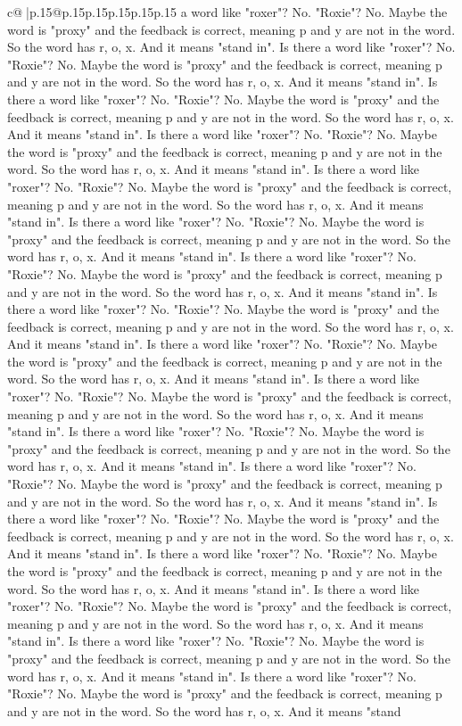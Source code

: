 \documentclass{article}
\begin{document}
{\begin{supertabular}{c@{$\;$}|p{.15\linewidth}@{}p{.15\linewidth}p{.15\linewidth}p{.15\linewidth}p{.15\linewidth}p{.15\linewidth}}
{{{a word like "roxer"? No. "Roxie"? No. Maybe the word is "proxy" and the feedback is correct, meaning p and y are not in the word. So the word has r, o, x. And it means "stand in". Is there a word like "roxer"? No. "Roxie"? No. Maybe the word is "proxy" and the feedback is correct, meaning p and y are not in the word. So the word has r, o, x. And it means "stand in". Is there a word like "roxer"? No. "Roxie"? No. Maybe the word is "proxy" and the feedback is correct, meaning p and y are not in the word. So the word has r, o, x. And it means "stand in". Is there a word like "roxer"? No. "Roxie"? No. Maybe the word is "proxy" and the feedback is correct, meaning p and y are not in the word. So the word has r, o, x. And it means "stand in". Is there a word like "roxer"? No. "Roxie"? No. Maybe the word is "proxy" and the feedback is correct, meaning p and y are not in the word. So the word has r, o, x. And it means "stand in". Is there a word like "roxer"? No. "Roxie"? No. Maybe the word is "proxy" and the feedback is correct, meaning p and y are not in the word. So the word has r, o, x. And it means "stand in". Is there a word like "roxer"? No. "Roxie"? No. Maybe the word is "proxy" and the feedback is correct, meaning p and y are not in the word. So the word has r, o, x. And it means "stand in". Is there a word like "roxer"? No. "Roxie"? No. Maybe the word is "proxy" and the feedback is correct, meaning p and y are not in the word. So the word has r, o, x. And it means "stand in". Is there a word like "roxer"? No. "Roxie"? No. Maybe the word is "proxy" and the feedback is correct, meaning p and y are not in the word. So the word has r, o, x. And it means "stand in". Is there a word like "roxer"? No. "Roxie"? No. Maybe the word is "proxy" and the feedback is correct, meaning p and y are not in the word. So the word has r, o, x. And it means "stand in". Is there a word like "roxer"? No. "Roxie"? No. Maybe the word is "proxy" and the feedback is correct, meaning p and y are not in the word. So the word has r, o, x. And it means "stand in". Is there a word like "roxer"? No. "Roxie"? No. Maybe the word is "proxy" and the feedback is correct, meaning p and y are not in the word. So the word has r, o, x. And it means "stand in". Is there a word like "roxer"? No. "Roxie"? No. Maybe the word is "proxy" and the feedback is correct, meaning p and y are not in the word. So the word has r, o, x. And it means "stand in". Is there a word like "roxer"? No. "Roxie"? No. Maybe the word is "proxy" and the feedback is correct, meaning p and y are not in the word. So the word has r, o, x. And it means "stand in". Is there a word like "roxer"? No. "Roxie"? No. Maybe the word is "proxy" and the feedback is correct, meaning p and y are not in the word. So the word has r, o, x. And it means "stand in". Is there a word like "roxer"? No. "Roxie"? No. Maybe the word is "proxy" and the feedback is correct, meaning p and y are not in the word. So the word has r, o, x. And it means "stand in". Is there a word like "roxer"? No. "Roxie"? No. Maybe the word is "proxy" and the feedback is correct, meaning p and y are not in the word. So the word has r, o, x. And it means "stand }}}
\end{supertabular}}
\end{document}
